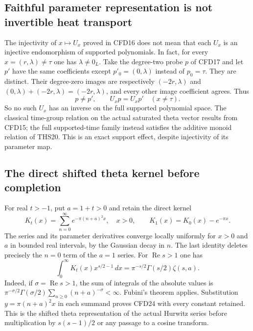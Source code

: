 \subsection{Faithful parameter representation is not invertible heat transport}

The injectivity of $x\mapsto U_x$ proved in CFD16 does not mean
that each $U_x$ is an injective endomorphism of supported polynomials.
In fact, for every $x=(r,\lambda)\ne\tau$ one has $\lambda\ne0_L$.
Take the degree-two probe $p$ of CFD17 and let $p'$ have the same
coefficients except $p'_0=(0,\lambda)$ instead of $p_0=\tau$.
They are distinct. Their degree-zero images are respectively
$(-2r,\lambda)$ and
$(0,\lambda)+(-2r,\lambda)=(-2r,\lambda)$, and every other image
coefficient agrees. Thus
\begin{equation}\tag{CFD22}
 p\ne p',\qquad U_xp=U_xp'\quad(x\ne\tau).
\end{equation}
So no such $U_x$ has an inverse on the full supported polynomial
space. The classical time-group relation on the actual saturated
theta vector results from CFD15; the full supported-time family
instead satisfies the additive monoid relation of THS20. This is
an exact support effect, despite injectivity of its parameter map.

\subsection{The direct shifted theta kernel before completion}

For real $t>-1$, put $a=1+t>0$ and retain the direct kernel
\begin{equation}\tag{CFD23}
 K_t(x)=\sum_{n=0}^{\infty}e^{-\pi(n+a)^2x},\quad x>0,
 \qquad
 K_1(x)=K_0(x)-e^{-\pi x}.
\end{equation}
The series and its parameter derivatives converge locally uniformly
for $x>0$ and $a$ in bounded real intervals, by the Gaussian decay in
$n$. The last identity deletes precisely the $n=0$ term of the
$a=1$ series. For $\operatorname{Re}s>1$ one has
\begin{equation}\tag{CFD24}
 \int_0^\infty K_t(x)x^{s/2-1}\,dx
       =\pi^{-s/2}\Gamma(s/2)\zeta(s,a).
\end{equation}
Indeed, if $\sigma=\operatorname{Re}s>1$, the sum of integrals of
the absolute values is
$\pi^{-\sigma/2}\Gamma(\sigma/2)
\sum_{n\ge0}(n+a)^{-\sigma}<\infty$.
Fubini's theorem applies. Substitution $y=\pi(n+a)^2x$ in each
summand proves CFD24 with every constant retained. This is the
shifted theta representation of the actual Hurwitz series before
multiplication by $s(s-1)/2$ or any passage to a cosine transform.

